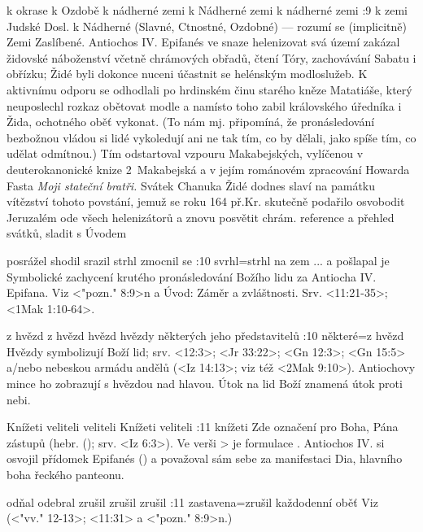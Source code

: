    {k okrase}   %
   {k Ozdobě}   %
   {k nádherné zemi}   %
   {k Nádherné zemi}   %
   {k nádherné zemi}   %
:9 {k zemi Judské} Dosl. k Nádherné (Slavné, Ctnostné, Ozdobné) --- rozumí se (implicitně) Zemi Zaslíbené. Antiochos IV. Epifanés ve snaze helenizovat svá území zakázal židovské náboženství včetně chrámových obřadů, čtení Tóry, zachovávání Sabatu i obřízku; Židé byli dokonce nuceni účastnit se helénským modloslužeb. K aktivnímu odporu se odhodlali po hrdinském činu starého kněze Matatiáše, který neuposlechl rozkaz obětovat modle a namísto toho zabil královského úředníka i Žida, ochotného oběť vykonat. (To nám mj. připomíná, že pronásledování bezbožnou vládou si lidé vykoledují ani ne tak tím, co by dělali, jako spíše tím, co udělat odmítnou.)
Tím odstartoval vzpouru Makabejských, vylíčenou v deuterokanonické knize 2~Makabejská a v jejím románovém zpracování Howarda Fasta {\em Moji stateční bratři.}
Svátek Chanuka Židé dodnes slaví na památku vítězství tohoto povstání, jemuž se roku 164 př.Kr. skutečně podařilo osvobodit Jeruzalém ode všech helenizátorů a znovu posvětit chrám.
\dopsat reference a přehled svátků, sladit s Úvodem


   {posrážel}   %
   {shodil}   %
   {srazil}   %
   {strhl}   %
   {zmocnil se}   %
:10 {svrhl}={strhl na zem ... a pošlapal je} Symbolické zachycení krutého pronásledování Božího lidu za Antiocha IV. Epifana. Viz <"pozn." 8:9>n a Úvod: Záměr a zvláštnosti. Srv. <11:21-35>; <1Mak 1:10-64>. %

    {z hvězd}   %
    {z hvězd}   %
    {hvězd}   %
    {hvězdy}   %
    {některých jeho představitelů}   %
:10 {některé}={z hvězd} Hvězdy symbolizují Boží lid; srv. <12:3>; <Jr 33:22>; <Gn 12:3>;  <Gn 15:5> a/nebo nebeskou armádu andělů %
(<Iz 14:13>; viz též <2Mak 9:10>). %
Antiochovy mince ho zobrazují s hvězdou nad hlavou. Útok na lid Boží znamená útok proti nebi.


   {Knížeti}   %
   {veliteli}   %
   {veliteli}   %
   {Knížeti}   %
   {veliteli}   %
:11 {knížeti} Zde označení pro Boha, Pána zástupů (hebr. 
(\Tsaba);
srv. <Iz 6:3>). Ve verši > je formulace . Antiochos IV. si osvojil přídomek Epifanés () a považoval sám sebe za manifestaci Dia, hlavního boha řeckého panteonu. 

   {odňal}   %
   {odebral}   %
   {zrušil}   %
   {zrušil}   %
   {zrušil}   %
:11 {zastavena}={zrušil každodenní oběť} Viz (<"vv." 12-13>; <11:31> a <"pozn." 8:9>n.)


